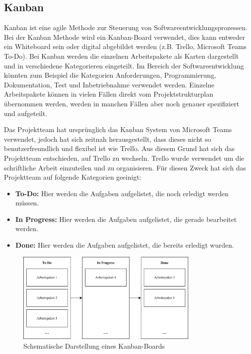 \subsection{Kanban}

Kanban ist eine agile Methode zur Steuerung von Softwareentwicklungsprozessen. Bei der Kanban Methode wird ein Kanban-Board verwendet, dies kann entweder ein Whiteboard sein oder digital abgebildet werden (z.B. Trello, Microsoft Teams To-Do). Bei Kanban werden die einzelnen Arbeitspakete als Karten dargestellt und in verschiedene Kategorieren eingeteilt. Im Bereich der Softwareentwicklung könnten zum Beispiel die Kategorien Anforderungen, Programmierung, Dokumentation, Test und Inbetriebnahme verwendet werden. Einzelne Arbeitspakete können in vielen Fällen direkt vom Projektstrukturplan übernommen werden, werden in manchen Fällen aber noch genauer spezifiziert und aufgeteilt. 

Das Projektteam hat ursprünglich das Kanban System von Microsoft Teams verwendet, jedoch hat sich zeitnah herausgestellt, dass dieses nicht so benutzerfreundlich und flexibel ist wie Trello. Aus diesem Grund hat sich das Projektteam entschieden, auf Trello zu wechseln. Trello wurde verwendet um die schriftliche Arbeit einzuteilen und zu organisieren. Für diesen Zweck hat sich das Projektteam auf folgende Kategorien geeinigt:

\begin{itemize}
    \item \textbf{To-Do:} Hier werden die Aufgaben aufgelistet, die noch erledigt werden müssen.
    \item \textbf{In Progress:} Hier werden die Aufgaben aufgelistet, die gerade bearbeitet werden.
    \item \textbf{Done:} Hier werden die Aufgaben aufgelistet, die bereits erledigt wurden.
\end{itemize}

\begin{figure}[H]
    \centering
    \includegraphics[width=0.8\textwidth]{images/kanban.png}
    \caption{Schematische Darstellung eines Kanban-Boards}
    \label{fig:kanban}
\end{figure}

